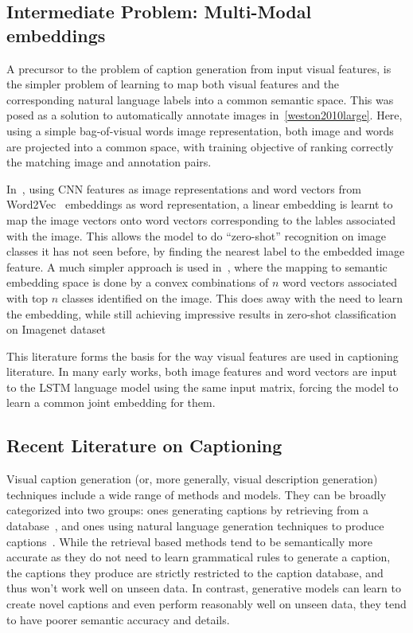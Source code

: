 \subsection{Intermediate Problem: Multi-Modal embeddings}
A precursor to the problem of caption generation from input visual features, is
the simpler problem of learning to map both visual features and the
corresponding natural language labels into a common semantic space.
This was posed as a solution to automatically annotate images
in~\ref{weston2010large}.
Here, using a simple bag-of-visual words image representation, both image and
words are projected into a common space, with training objective of ranking
correctly the matching image and annotation pairs. 

In~\cite{frome2013devise}, using CNN features as image representations and
word vectors from Word2Vec~\cite{mikolov2013distributed} embeddings as word
representation, a linear embedding is learnt to map the image vectors onto
word vectors corresponding to the lables associated with the image.
This allows the model to do ``zero-shot'' recognition on image classes it has
not seen before, by finding the nearest label to the embedded image feature.
A much simpler approach is used in~\cite{norouzi2013zero}, where the mapping to
semantic embedding space is done by a convex combinations of $n$ word vectors
associated with top $n$ classes identified on the image.
This does away with the need to learn the embedding, while still achieving
impressive results in zero-shot classification on Imagenet dataset

This literature forms the basis for the way visual features are used in
captioning literature.
In many early works, both image features and word vectors are input to the LSTM
language model using the same input matrix, forcing the model to learn a common
joint embedding for them.

\subsection{Recent Literature on Captioning}
Visual caption generation (or, more generally, visual description generation)
techniques include a wide range of methods and models.
They can be broadly categorized into two groups: ones generating captions by
retrieving from a database~\cite{Farhadi2010, Hodosh2013,Karpathy2014},
and ones using natural language generation techniques to produce
captions~\cite{Li2011,kulkarni2013babytalk,Vinyals_2015_CVPR,Fang2015}.
While the retrieval based methods tend to be semantically more accurate as they
do not need to learn grammatical rules to generate a caption, the captions they
produce are strictly restricted to the caption database, and thus won't work
well on unseen data.
In contrast, generative models can learn to create novel captions and even
perform reasonably well on unseen data, they tend to have poorer semantic
accuracy and details.

